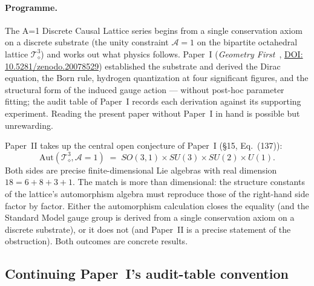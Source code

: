 
\label{sec:introduction}

\paragraph{Programme.}  The A=1 Discrete Causal Lattice series
begins from a single conservation axiom on a discrete substrate
(the unity constraint $\mathcal{A}=1$ on the bipartite octahedral
lattice $\mathcal{T}_\diamond^3$) and works out what physics
follows.  Paper~I (\emph{Geometry First}~\cite{menendez2026geometry},
\href{https://doi.org/10.5281/zenodo.20078529}%
     {DOI: 10.5281/zenodo.20078529})
established the substrate and derived the Dirac equation, the Born
rule, hydrogen quantization at four significant figures, and the
structural form of the induced gauge action --- without post-hoc
parameter fitting; the audit table of Paper~I records each
derivation against its supporting experiment.  Reading the present
paper without Paper~I in hand is possible but unrewarding.

Paper~II takes up the central open conjecture of Paper~I
(§15, Eq.~(137)):
%
\begin{equation}
\label{eq:automorphism_conjecture}
\mathrm{Aut}(\mathcal{T}_\diamond^3, \mathcal{A}=1)
\;=\; SO(3,1) \times SU(3) \times SU(2) \times U(1).
\end{equation}
%
Both sides are precise finite-dimensional Lie algebras with real
dimension $18 = 6 + 8 + 3 + 1$.  The match is more than dimensional:
the structure constants of the lattice's automorphism algebra must
reproduce those of the right-hand side factor by factor.  Either the
automorphism calculation closes the equality (and the Standard Model
gauge group is derived from a single conservation axiom on a discrete
substrate), or it does not (and Paper~II is a precise statement of
the obstruction).  Both outcomes are concrete results.

\subsection{Continuing Paper~I's audit-table convention}
\label{subsec:audit_convention}

